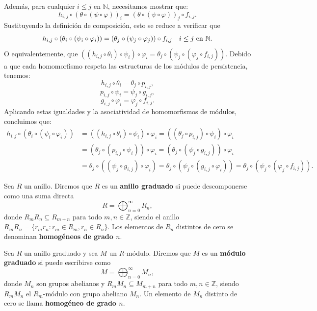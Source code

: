 Además, para cualquier \(i \leq j\) en \(\mathbb{N}\), necesitamos mostrar que:
\[
h_{i,j} \circ (\theta \circ (\psi \circ \varphi))_i = (\theta \circ (\psi \circ \varphi))_j \circ f_{i,j}.
\]
Sustituyendo la definición de composición, esto se reduce a verificar que
\[
h_{i,j} \circ (\theta_i \circ (\psi_i \circ \varphi_i)) = (\theta_j \circ (\psi_j \circ \varphi_j)) \circ f_{i,j} \quad  i \leq j \text{ en } \mathbb{N}.
\]
O equivalentemente, que $((h_{i,j} \circ \theta_i) \circ \psi_i) \circ \varphi_i = \theta_j \circ (\psi_j \circ (\varphi_j \circ f_{i,j}))$.
Debido a que cada homomorfismo respeta las estructuras de los módulos de persistencia, tenemos:
\[
h_{i,j} \circ \theta_i = \theta_j \circ p_{i,j},
\]
\[
p_{i,j} \circ \psi_i = \psi_j \circ g_{i,j},
\]
\[
g_{i,j} \circ \varphi_i = \varphi_j \circ f_{i,j}.
\]
Aplicando estas igualdades y la asociatividad de homomorfismos de módulos, concluimos que:
\begin{align*}
h_{i,j} \circ (\theta_i \circ (\psi_i \circ \varphi_i)) &= ((h_{i,j} \circ \theta_i) \circ \psi_i) \circ \varphi_i = ((\theta_j \circ p_{i,j}) \circ \psi_i) \circ \varphi_i \\
&= (\theta_j \circ (p_{i,j} \circ \psi_i)) \circ \varphi_i = (\theta_j \circ (\psi_j \circ g_{i,j})) \circ \varphi_i \\
&= \theta_j \circ ((\psi_j \circ g_{i,j}) \circ \varphi_i) = \theta_j \circ (\psi_j \circ (g_{i,j} \circ \varphi_i))
= \theta_j \circ (\psi_j \circ (\varphi_j \circ f_{i,j})).
\end{align*}

\begin{definicion}
	Sea \( R \) un anillo. Diremos que \( R \) es un \textbf{anillo graduado} si puede descomponerse como una suma directa
	\[
	R = \bigoplus_{n=0}^{\infty} R_n,
	\]
	donde \( R_m R_n \subseteq R_{m+n} \) para todo \( m, n \in \mathbb{Z} \), siendo el anillo \(R_m R_n = \{ r_m r_n : r_m \in R_m, r_n \in R_n \}\). Los elementos de \( R_n \) distintos de cero se denominan \textbf{homogéneos de grado \( n \)}.
\end{definicion}

\begin{definicion}
	Sea \( R \) un anillo graduado y sea \( M \) un \( R \)-módulo. Diremos que \( M \) es un \textbf{módulo graduado} si puede escribirse como
	\[
	M = \bigoplus_{n=0}^{\infty} M_n,
	\]
	donde \( M_n \) son grupos abelianos y \( R_m M_n \subseteq M_{m+n} \) para todo \( m, n \in \mathbb{Z} \), siendo \(R_m M_n\) el \(R_m\)-módulo con grupo abeliano \( M_n \). Un elemento de \( M_n \) distinto de cero se llama \textbf{homogéneo de grado \( n \)}.
\end{definicion}


